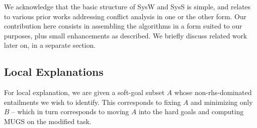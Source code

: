 %

We acknowledge that the basic structure of SysW and SysS is simple,
and relates to various prior works addressing conflict analysis in one
or the other form. Our contribution here consists in assembling the
algorithms in a form suited to our purposes, plus small enhancements
as described. We briefly discuss related work later on, in a separate
section.






\subsection{Local Explanations}
\label{algorithms:le}

For local explanation, we are given a soft-goal subset $A$ whose
non-rhs-dominated entailments we wish to identify. This corresponds to
fixing $A$ and minimizing only $B$ -- which in turn corresponds to
moving $A$ into the hard goals and computing MUGS on the modified
task.

